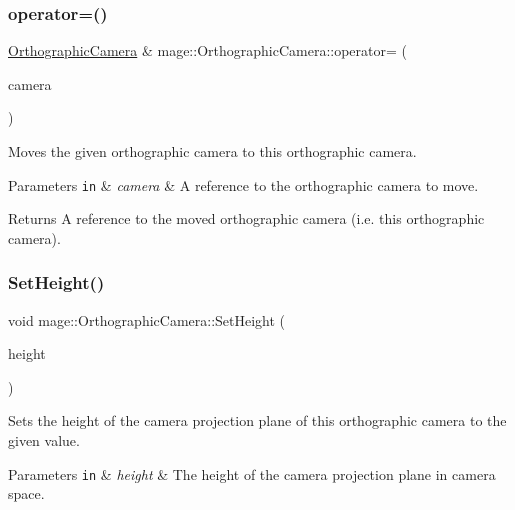 \subsubsection{\texorpdfstring{operator=()}{operator=()}\hspace{0.1cm}{\footnotesize\ttfamily [2/2]}}
{\footnotesize\ttfamily \hyperlink{classmage_1_1_orthographic_camera}{Orthographic\+Camera} \& mage\+::\+Orthographic\+Camera\+::operator= (\begin{DoxyParamCaption}\item[{\hyperlink{classmage_1_1_orthographic_camera}{Orthographic\+Camera} \&\&}]{camera }\end{DoxyParamCaption})\hspace{0.3cm}{\ttfamily [default]}}

Moves the given orthographic camera to this orthographic camera.


\begin{DoxyParams}[1]{Parameters}
\mbox{\tt in}  & {\em camera} & A reference to the orthographic camera to move. \\
\hline
\end{DoxyParams}
\begin{DoxyReturn}{Returns}
A reference to the moved orthographic camera (i.\+e. this orthographic camera). 
\end{DoxyReturn}
\hypertarget{classmage_1_1_orthographic_camera_a8b1c440a48905805e261034f756aeab6}{}\label{classmage_1_1_orthographic_camera_a8b1c440a48905805e261034f756aeab6} 
\subsubsection{\texorpdfstring{Set\+Height()}{SetHeight()}}
{\footnotesize\ttfamily void mage\+::\+Orthographic\+Camera\+::\+Set\+Height (\begin{DoxyParamCaption}\item[{float}]{height }\end{DoxyParamCaption})\hspace{0.3cm}{\ttfamily [noexcept]}}

Sets the height of the camera projection plane of this orthographic camera to the given value.


\begin{DoxyParams}[1]{Parameters}
\mbox{\tt in}  & {\em height} & The height of the camera projection plane in camera space. \\
\hline
\end{DoxyParams}
\hypertarget{classmage_1_1_orthographic_camera_af0c39e7ad5271f1b78437aa54275c3e3}{}\label{classmage_1_1_orthographic_camera_af0c39e7ad5271f1b78437aa54275c3e3} 
